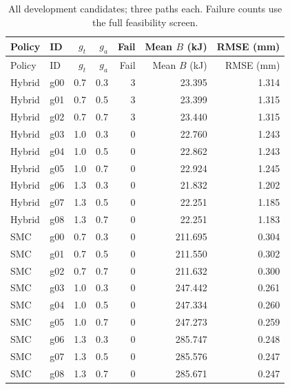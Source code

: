 \begingroup\hypersetup{hypertexnames=true}\small\setlength{\tabcolsep}{4pt}
\begin{longtable}{llrrrrr}
\caption{All development candidates; three paths each. Failure counts use the full feasibility screen.}\\\toprule
Policy & ID & $g_t$ & $g_a$ & Fail & Mean $B$ (kJ) & RMSE (mm)\\\midrule\endfirsthead
\toprule Policy & ID & $g_t$ & $g_a$ & Fail & Mean $B$ (kJ) & RMSE (mm)\\\midrule\endhead
Hybrid & g00 & 0.7 & 0.3 & 3 & 23.395 & 1.314 \\
Hybrid & g01 & 0.7 & 0.5 & 3 & 23.399 & 1.315 \\
Hybrid & g02 & 0.7 & 0.7 & 3 & 23.440 & 1.315 \\
Hybrid & g03 & 1.0 & 0.3 & 0 & 22.760 & 1.243 \\
Hybrid & g04 & 1.0 & 0.5 & 0 & 22.862 & 1.243 \\
Hybrid & g05 & 1.0 & 0.7 & 0 & 22.924 & 1.245 \\
Hybrid & g06 & 1.3 & 0.3 & 0 & 21.832 & 1.202 \\
Hybrid & g07 & 1.3 & 0.5 & 0 & 22.251 & 1.185 \\
Hybrid & g08 & 1.3 & 0.7 & 0 & 22.251 & 1.183 \\
SMC & g00 & 0.7 & 0.3 & 0 & 211.695 & 0.304 \\
SMC & g01 & 0.7 & 0.5 & 0 & 211.550 & 0.302 \\
SMC & g02 & 0.7 & 0.7 & 0 & 211.632 & 0.300 \\
SMC & g03 & 1.0 & 0.3 & 0 & 247.442 & 0.261 \\
SMC & g04 & 1.0 & 0.5 & 0 & 247.334 & 0.260 \\
SMC & g05 & 1.0 & 0.7 & 0 & 247.273 & 0.259 \\
SMC & g06 & 1.3 & 0.3 & 0 & 285.747 & 0.248 \\
SMC & g07 & 1.3 & 0.5 & 0 & 285.576 & 0.247 \\
SMC & g08 & 1.3 & 0.7 & 0 & 285.671 & 0.247 \\
\bottomrule\end{longtable}\endgroup
\begingroup\hypersetup{hypertexnames=true}\small\setlength{\tabcolsep}{4pt}
